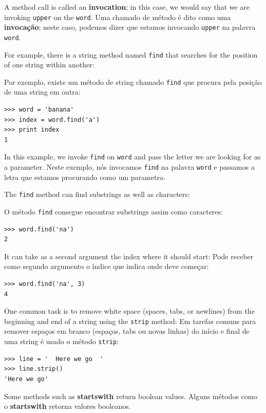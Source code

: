 {

A method call is called an {\bf invocation}; in this case, we would
say that we are invoking {\tt upper} on the {\tt word}.
Uma chamado de método é dito como uma {\bf invocação}; neste caso, podemos
dizer que estamos invocando {\tt upper} na palavra {\tt word}.


For example, there is a string method named {\tt find} that
searches for the position of one string within another:

Por exemplo, existe um método de string chamado {\tt find} que procura pela
posição de uma string em outra:

\beforeverb
\begin{verbatim}
>>> word = 'banana'
>>> index = word.find('a')
>>> print index
1
\end{verbatim}
\afterverb
%
In this example, we invoke {\tt find} on {\tt word} and pass
the letter we are looking for as a parameter.
%
Neste exemplo, nós invocamos {\tt find} na palavra {\tt word} e passamos a
letra que estamos procurando como um parametro.

The {\tt find} method can find substrings as well as characters:

O método {\tt find} consegue  encontrar substrings assim como caracteres:

\beforeverb
\begin{verbatim}
>>> word.find('na')
2
\end{verbatim}
\afterverb
%
It can take as a second argument the index where it should start:
%
Pode receber como segundo argumento o índice que indica onde deve começar:


\beforeverb
\begin{verbatim}
>>> word.find('na', 3)
4
\end{verbatim}
\afterverb
%
One common task is to remove white space (spaces, tabs, or newlines) from
the beginning and end of a string using the {\tt strip} method:
%
Em tarefas comuns para remover espaços em branco (espaços, tabs ou novas
linhas) do início e final de uma string é usado o método {\tt strip}:

\beforeverb
\begin{verbatim}
>>> line = '  Here we go  '
>>> line.strip()
'Here we go'
\end{verbatim}
\afterverb
%
Some methods such as {\bf startswith} return boolean values.
%
Alguns métodos como o {\bf startswith} retorna valores booleanos.

}
